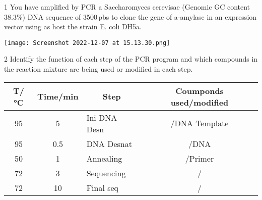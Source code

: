 \documentclass[\mainfilename]{subfiles}
\begin{document}
\begin{questionBox}1{ %
    You have amplified by PCR a Saccharomyces cerevisae (Genomic GC content 38.3\%) DNA sequence of 3500\,pbs to clone the gene of a-amylase in an expression vector using as host the strain E. coli DH5a.
} %

    \begin{center}
        \texttt{[image: Screenshot 2022-12-07 at 15.13.30.png]}
    \end{center}

\end{questionBox}

\begin{questionBox}2{ %
    Identify the function of each step of the PCR program and which compounds in the reaction mixture are being used or modified in each step.
} %
    
    \begin{table}[H]\centering

        \setlength\tabcolsep{3mm}        %
        \renewcommand\arraystretch{1.25} %

        \begin{tabular}{cclc}
            
            \\\toprule
            
                \multicolumn{1}{c}{T/\unit{\celsius}}
            &   \multicolumn{1}{c}{Time/\unit{\minute}}
            &   \multicolumn{1}{c}{Step}
            &   \multicolumn{1}{c}{Coumponds used/modified}
            
            \\\midrule
            
                95 &   5 & Ini DNA Desn & /DNA Template
            \\  95 & 0.5 & DNA Desnat   & /DNA
            \\  50 &   1 & Annealing    & /Primer
            \\  72 &   3 & Sequencing   & /
            \\  72 &  10 & Final seq    & /
            
            \\\bottomrule
            
        \end{tabular}
    \end{table}

\end{questionBox}
\end{document}
